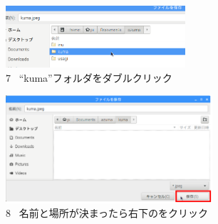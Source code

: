 \documentclass[a4paper,12pt]{jarticle}
\begin{document}
\begin{figure}[t]
  \begin{minipage}{\textwidth}
    \begin{minipage}{6.582cm}
      \includegraphics[width=6.671cm,height=2.314cm]{textbook-img100.png}\\
      7 \ “kuma”フォルダをダブルクリック
    \end{minipage}
    \begin{minipage}{2.582cm}
    \end{minipage}
    \begin{minipage}{6.582cm}
      \includegraphics[width=7.668cm,height=4.023cm]{textbook-img099.png}\\
      8 \ 名前と場所が決まったら右下のをクリック
    \end{minipage}
  \end{minipage}


  \bigskip



\end{figure}
\end{document}
